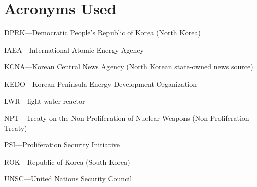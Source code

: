\chapter*{Acronyms Used}

DPRK---Democratic People's Republic of Korea (North Korea)

\noindent IAEA---International Atomic Energy Agency

\noindent KCNA---Korean Central News Agency (North Korean state-owned news source)

\noindent KEDO---Korean Peninsula Energy Development Organization

\noindent LWR---light-water reactor

\noindent NPT---Treaty on the Non-Proliferation of Nuclear Weapons (Non-Proliferation Treaty)

\noindent PSI---Proliferation Security Initiative

\noindent ROK---Republic of Korea (South Korea)

\noindent UNSC---United Nations Security Council